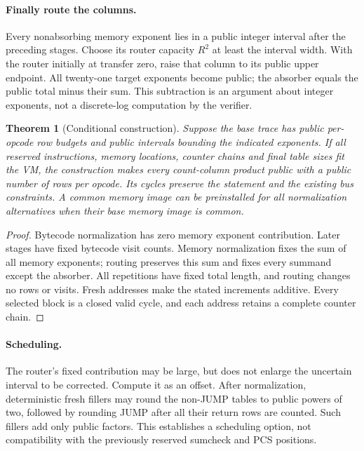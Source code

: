 \documentclass[11pt]{article}
\newtheorem{theorem}{Theorem}
\begin{document}
\paragraph{Finally route the columns.} Every nonabsorbing memory exponent lies in a public integer interval after the preceding stages. Choose its router capacity $R^2$ at least the interval width. With the router initially at transfer zero, raise that column to its public upper endpoint. All twenty-one target exponents become public; the absorber equals the public total minus their sum. This subtraction is an argument about integer exponents, not a discrete-log computation by the verifier.

\begin{theorem}[Conditional construction]
Suppose the base trace has public per-opcode row budgets and public intervals bounding the indicated exponents. If all reserved instructions, memory locations, counter chains and final table sizes fit the VM, the construction makes every count-column product public with a public number of rows per opcode. Its cycles preserve the statement and the existing bus constraints. A common memory image can be preinstalled for all normalization alternatives when their base memory image is common.
\end{theorem}
\begin{proof}
Bytecode normalization has zero memory exponent contribution. Later stages have fixed bytecode visit counts. Memory normalization fixes the sum of all memory exponents; routing preserves this sum and fixes every summand except the absorber. All repetitions have fixed total length, and routing changes no rows or visits. Fresh addresses make the stated increments additive. Every selected block is a closed valid cycle, and each address retains a complete counter chain.
\end{proof}

\paragraph{Scheduling.} The router's fixed contribution may be large, but does not enlarge the uncertain interval to be corrected. Compute it as an offset. After normalization, deterministic fresh fillers may round the non-JUMP tables to public powers of two, followed by rounding JUMP after all their return rows are counted. Such fillers add only public factors. This establishes a scheduling option, not compatibility with the previously reserved sumcheck and PCS positions.
\end{document}
